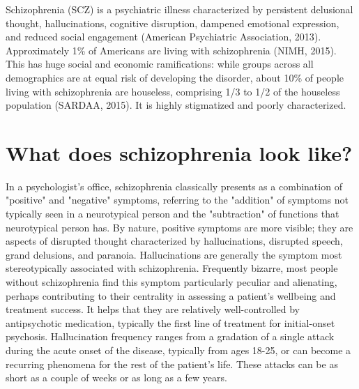 \documentclass[12pt,twoside]{reedthesis}
\begin{document}
	Schizophrenia (SCZ) is a psychiatric illness characterized by persistent delusional thought, hallucinations, cognitive disruption, dampened emotional expression, and reduced social engagement (American Psychiatric Association, 2013). Approximately 1\% of Americans are living with schizophrenia (NIMH, 2015). This has huge social and economic ramifications: while groups across all demographics are at equal risk of developing the disorder, about 10\% of people living with schizophrenia are houseless, comprising 1/3 to 1/2 of the houseless population (SARDAA, 2015). It is highly stigmatized and poorly characterized.
	
	\section{What does schizophrenia look like?}
	In a psychologist's office, schizophrenia classically presents as a combination of "positive" and "negative" symptoms, referring to the "addition" of symptoms not typically seen in a neurotypical person and the "subtraction" of functions that neurotypical person has. By nature, positive symptoms are more visible; they are aspects of disrupted thought characterized by hallucinations, disrupted speech, grand delusions, and paranoia. Hallucinations are generally the symptom most stereotypically associated with schizophrenia. Frequently bizarre, most people without schizophrenia find this symptom particularly peculiar and alienating, perhaps contributing to their centrality in assessing a patient's wellbeing and treatment success.  It helps that they are relatively well-controlled by antipsychotic medication, typically the first line of treatment for initial-onset psychosis. Hallucination frequency ranges from a gradation of a single attack during the acute onset of the disease, typically from ages 18-25, or can become a recurring phenomena for the rest of the patient's life. These attacks can be as short as a couple of weeks or as long as a few years. 
	
\end{document}
